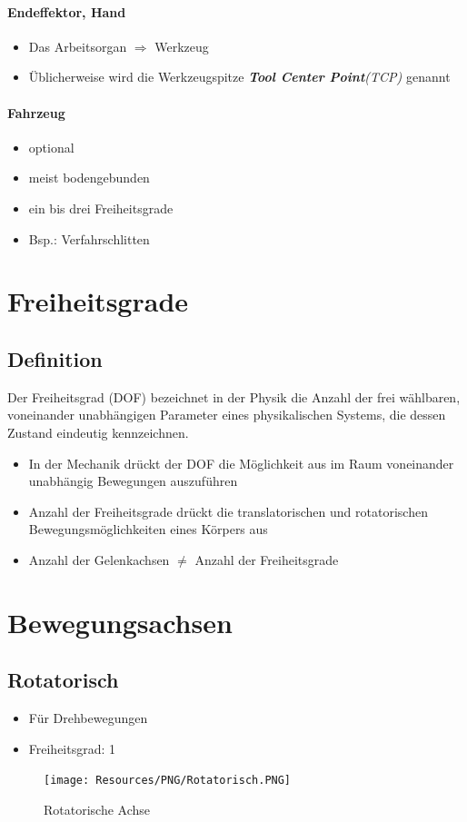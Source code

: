 \paragraph{Endeffektor, Hand}
\begin{itemize}
	\item Das Arbeitsorgan $\Rightarrow$ Werkzeug
	\item Üblicherweise wird die Werkzeugspitze \textit{\textbf{Tool Center Point}(TCP)} genannt
\end{itemize}

\paragraph{Fahrzeug}
\begin{itemize}
	\item optional
	\item meist bodengebunden
	\item ein bis drei Freiheitsgrade
	\item Bsp.: Verfahrschlitten
\end{itemize}

\section{Freiheitsgrade}
\subsection{Definition}
Der Freiheitsgrad (DOF) bezeichnet in der Physik die Anzahl der frei wählbaren, voneinander unabhängigen Parameter eines physikalischen Systems, die dessen Zustand eindeutig kennzeichnen.
\begin{itemize}
	\item In der Mechanik drückt der DOF die Möglichkeit aus im Raum voneinander unabhängig Bewegungen auszuführen
	\item Anzahl der Freiheitsgrade drückt die translatorischen und rotatorischen Bewegungsmöglichkeiten eines Körpers aus
	\item Anzahl der Gelenkachsen $\neq$ Anzahl der Freiheitsgrade
\end{itemize}

\section{Bewegungsachsen}
\subsection{Rotatorisch}
\begin{itemize}
	\item Für Drehbewegungen
	\item Freiheitsgrad: 1
\end{itemize}
\begin{figure}[H]
	\begin{center}
		\texttt{[image: Resources/PNG/Rotatorisch.PNG]}
		\caption{Rotatorische Achse}
		\label{fig:PNG/Rotatorisch.PNG}
	\end{center}
\end{figure}

